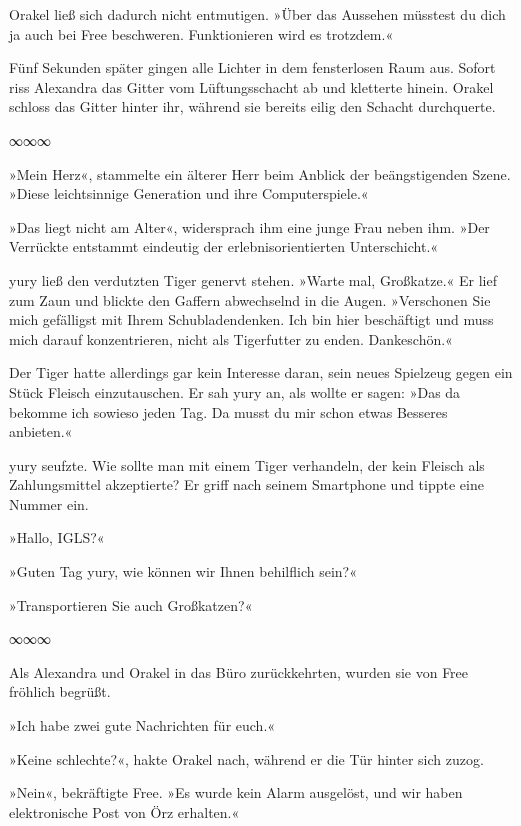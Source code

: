 Orakel ließ sich dadurch nicht entmutigen. »Über das Aussehen müsstest du dich ja auch bei Free beschweren. Funktionieren wird es trotzdem.«

Fünf Sekunden später gingen alle Lichter in dem fensterlosen Raum aus. Sofort riss Alexandra das Gitter vom Lüftungsschacht ab und kletterte hinein. Orakel schloss das Gitter hinter ihr, während sie bereits eilig den Schacht durchquerte.

\begin{center}
	∞∞∞
\end{center}

»Mein Herz«, stammelte ein älterer Herr beim Anblick der beängstigenden Szene. »Diese leichtsinnige Generation und ihre Computerspiele.«

»Das liegt nicht am Alter«, widersprach ihm eine junge Frau neben ihm. »Der Verrückte entstammt eindeutig der erlebnisorientierten Unterschicht.«

yury ließ den verdutzten Tiger genervt stehen. »Warte mal, Großkatze.« Er lief zum Zaun und blickte den Gaffern abwechselnd in die Augen. »Verschonen Sie mich gefälligst mit Ihrem Schubladendenken. Ich bin hier beschäftigt und muss mich darauf konzentrieren, nicht als Tigerfutter zu enden. Dankeschön.«

Der Tiger hatte allerdings gar kein Interesse daran, sein neues Spielzeug gegen ein Stück Fleisch einzutauschen. Er sah yury an, als wollte er sagen: »Das da bekomme ich sowieso jeden Tag. Da musst du mir schon etwas Besseres anbieten.«

yury seufzte. Wie sollte man mit einem Tiger verhandeln, der kein Fleisch als Zahlungsmittel akzeptierte? Er griff nach seinem Smartphone und tippte eine Nummer ein.

»Hallo, IGLS?«

»Guten Tag yury, wie können wir Ihnen behilflich sein?«

»Transportieren Sie auch Großkatzen?«

\begin{center}
	∞∞∞
\end{center}

Als Alexandra und Orakel in das Büro zurückkehrten, wurden sie von Free fröhlich begrüßt.

»Ich habe zwei gute Nachrichten für euch.«

»Keine schlechte?«, hakte Orakel nach, während er die Tür hinter sich zuzog.

»Nein«, bekräftigte Free. »Es wurde kein Alarm ausgelöst, und wir haben elektronische Post von Örz erhalten.«

